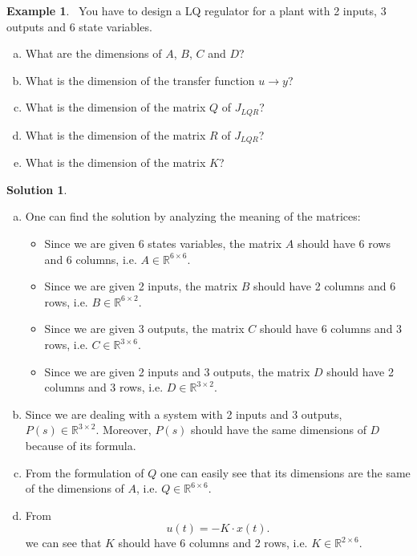 \documentclass[a4paper,12 pt]{article}
\numberwithin{equation}{section}
\theoremstyle{definition}
\newtheorem{bsp}{Example}
\theoremstyle{remark}
\theoremstyle{definition}
\newtheorem*{lsg}{Solution}
\theoremstyle{definition}
\theoremstyle{definition}
\theoremstyle{remark}
\begin{document}
\begin{bsp}
\
You have to design a LQ regulator for a plant with 2 inputs, 3 outputs and 6 state variables.
\begin{enumerate}[(a)]
\item What are the dimensions of $A$, $B$, $C$ and $D$?
\item What is the dimension of the transfer function $u\rightarrow y$?
\item What is the dimension of the matrix $Q$ of $J_{LQR}$?
\item What is the dimension of the matrix $R$ of $J_{LQR}$?
\item What is the dimension of the matrix $K$?
\end{enumerate}
\newpage
\begin{lsg}
\
\begin{enumerate}[(a)]
\item One can find the solution by analyzing the meaning of the matrices:
\begin{itemize}
\item Since we are given 6 states variables, the matrix $A$ should have 6 rows and 6 columns, i.e. $A\in \mathbb{R}^{6\times6}$.
\item Since we are given 2 inputs, the matrix $B$ should have 2 columns and 6 rows, i.e. $B\in \mathbb{R}^{6\times2}$.
\item Since we are given 3 outputs, the matrix $C$ should have 6 columns and 3 rows, i.e. $C\in \mathbb{R}^{3\times6}$.
\item Since we are given 2 inputs and 3 outputs, the matrix $D$ should have 2 columns and 3 rows, i.e. $D\in \mathbb{R}^{3\times2}$.
\end{itemize}
\item Since we are dealing with a system with 2 inputs and 3 outputs, $P(s)\in \mathbb{R}^{3\times2}$. Moreover, $P(s)$ should have the same dimensions of $D$ because of its formula.
\item From the formulation of $Q$ one can easily see that its dimensions are the same of the dimensions of $A$, i.e. $Q \in \mathbb{R}^{6\times6}$.
\item From 
$$u(t)=-K\cdot x(t).$$
we can see that $K$ should have 6 columns and 2 rows, i.e. $K\in \mathbb{R}^{2\times6}$.
\end{enumerate}

\end{lsg}

\end{bsp}
\end{document}
